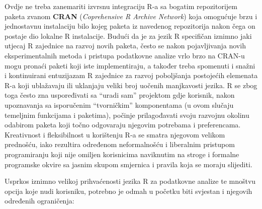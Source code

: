\documentclass[]{book}
\theoremstyle{definition}
\theoremstyle{definition}
\theoremstyle{definition}
\theoremstyle{remark}
\begin{document}
Ovdje ne treba zanemariti izvrsnu integraciju R-a sa bogatim
repozitorijem paketa zvanom \textbf{CRAN} (\emph{Coprehensive R Archive
Network}) koja omogućuje brzu i jednostavnu instalaciju bilo kojeg
paketa iz navedenog repozitorija nakon čega on postaje dio lokalne R
instalacije. Budući da je za jezik R specifičan iznimno jaki utjecaj R
zajednice na razvoj novih paketa, često se nakon pojavljivanja novih
eksperimentalnih metoda i pristupa podatkovne analize vrlo brzo na
CRAN-u mogu pronaći paketi koji iste implementiraju, a također treba
spomenuti i snažni i kontinuirani entuzijazam R zajednice za razvoj
poboljšanja postojećih elemenata R-a koji ublažavaju ili uklanjaju
veliki broj uočenih manjkavosti jezika. R se zbog toga često zna
uspoređivati sa ``uradi sam'' projektom gdje korisnik, nakon upoznavanja
sa isporučenim ``tvorničkim'' komponentama (u ovom slučaju temeljnim
funkcijama i paketima), počinje prilagođavati svoju razvojnu okolinu
odabirom paketa koji točno odgovaraju njegovim potrebama i preferencama.
Kreativnost i fleksibilnost u korištenju R-a se smatra njegovom velikom
prednošću, iako rezultira određenom neformalnošću i liberalnim pristupom
programiranju koji nije omiljen korisnicima naviknutim na stroge i
formalne programske okvire sa jasnim skupom smjernica i pravila koja se
moraju slijediti.

Usprkos iznimno velikoj prihvaćenosti jezika R za podatkovne analize te
mnoštvu opcija koje nudi korisniku, potrebno je odmah u početku biti
svjestan i njegovih određenih ograničenja:
\end{document}
